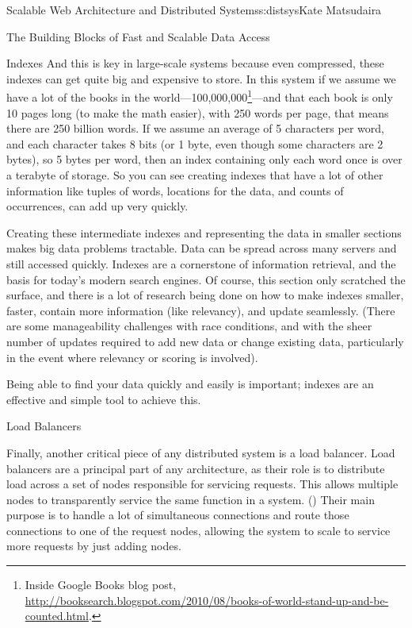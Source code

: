 \begin{aosachapter}{Scalable Web Architecture and Distributed Systems}{s:distsys}{Kate Matsudaira}
\begin{aosasect1}{The Building Blocks of Fast and Scalable Data Access}
\begin{aosasect2}{Indexes}
And this is key in large-scale systems because even compressed, these
indexes can get quite big and expensive to store. In this system if we
assume we have a lot of the books in the 
world---100,000,000\footnote{Inside Google Books blog post,
  \url{http://booksearch.blogspot.com/2010/08/books-of-world-stand-up-and-be-counted.html}.}---and that each book is only 10 pages long (to make the 
math easier),
with 250 words per page, that means there are 250 billion words. If
we assume an average of 5 characters per word, and each character takes 8 bits (or
1 byte, even though some characters are 2 bytes), so 5 bytes per word,
then an index containing only each word once is over a terabyte of storage.
So you can see creating indexes that have a lot
of other information like tuples of words, locations for the data,
and counts of occurrences, can add up very quickly.

Creating these intermediate indexes and representing the data in
smaller sections makes big data problems tractable. Data can
be spread across many servers and still accessed quickly. Indexes are
a cornerstone of information retrieval, and the basis for today's
modern search engines. Of course, this section only scratched the
surface, and there is a lot of research being done on how to make
indexes smaller, faster, contain more
information (like relevancy), and update seamlessly. (There are some
manageability challenges with race conditions, and with the sheer number of
updates required to add new data or change existing
data, particularly in the event where relevancy or scoring is
involved).

Being able to find your data quickly and easily is important; indexes
are an effective and simple tool to achieve this.

\end{aosasect2}

\begin{aosasect2}{Load Balancers}

Finally, another critical piece of any distributed system is a load
balancer. Load balancers are a principal part of any architecture, as their
role is to distribute load across a set of nodes responsible for
servicing requests. This allows multiple nodes to transparently
service the same function in a system. () Their main purpose is to handle
a lot of simultaneous connections and route those connections to one
of the request nodes, allowing the system to scale to service more
requests by just adding nodes.


\end{aosasect2}
\end{aosasect1}
\end{aosachapter}
